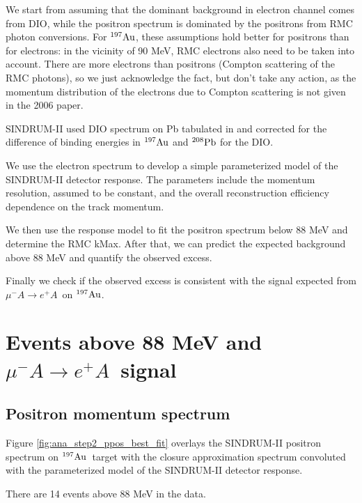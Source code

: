 \documentclass[12pt]{article}
\newcommand {\Au}[1]     {\mbox{$\rm ^{#1}Au$}}                 %
\newcommand {\mumepconv} {\mbox{$\mu^- A \rightarrow e^+ A$}}
\newcommand {\Pb}[1]     {\mbox{$\rm ^{#1}Pb$}}                 %
\begin{document}
We start from assuming that the dominant background in electron channel comes from DIO,
while the positron spectrum is dominated by the positrons from RMC photon conversions.
For \Au{197}, these assumptions hold better for positrons than for electrons:
in the vicinity of 90 MeV, RMC electrons also need to be taken into account.
There are more electrons than positrons (Compton scattering of the RMC photons),
so we just acknowledge the fact, but don't take any action, as the momentum distribution
of the electrons due to Compton scattering is not given in the 2006 paper.

SINDRUM-II used DIO spectrum on Pb tabulated in \cite{Watanabe_1993} and corrected for the
difference of binding energies in \Au{197} and \Pb{208} for the DIO.

We use the electron spectrum to develop a simple parameterized model of
the SINDRUM-II detector response. The parameters include the momentum resolution,
assumed to be constant, and the overall reconstruction efficiency dependence on the 
track momentum.

We then use the response model to fit the positron spectrum below 88 MeV and
determine the RMC kMax. After that, we can predict the expected background
above 88 MeV and quantify the observed excess.

Finally we check if the observed excess is consistent with the signal expected from
\mumepconv\ on \Au{197}.




\newpage
\section {Events above 88 MeV and \mumepconv\ signal}


\subsection {Positron momentum spectrum}

Figure \ref{fig:ana_step2_ppos_best_fit} overlays the SINDRUM-II positron spectrum on
\Au{197}\ target with the closure approximation spectrum convoluted with the 
parameterized model of the SINDRUM-II detector response.

There are 14 events above 88 MeV in the data.
\end{document}
